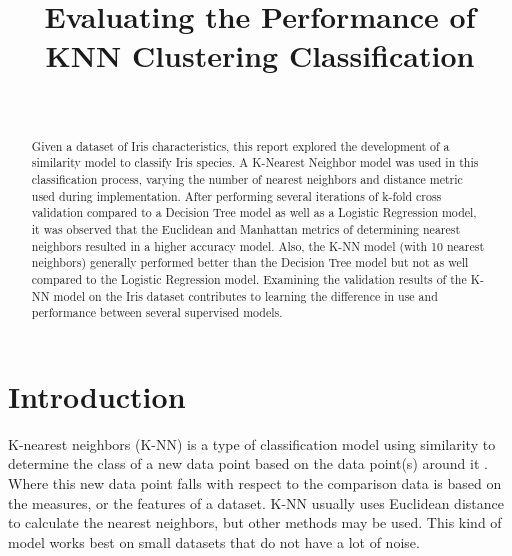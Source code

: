 \documentclass[journal]{IEEEtran}
\begin{document}
\setlength{\emergencystretch}{12pt}
\setlength{\parindent}{10pt}



\lstset{style=mystyle}

\title{Evaluating the Performance of KNN Clustering Classification}

\author{
\\
}

\maketitle

\begin{abstract}
\label{log:abstract}
Given a dataset of Iris characteristics, this report explored the development of a similarity model to classify Iris species. A K-Nearest Neighbor model was used in this classification process, varying the number of nearest neighbors and distance metric used during implementation. After performing several iterations of k-fold cross validation compared to a Decision Tree model as well as a Logistic Regression model, it was observed that the Euclidean and Manhattan metrics of determining nearest neighbors resulted in a higher accuracy model. Also, the K-NN model (with 10 nearest neighbors) generally performed better than the Decision Tree model but not as well compared to the Logistic Regression model. Examining the validation results of the K-NN model on the Iris dataset contributes to learning the difference in use and performance between several supervised models.

\end{abstract}

\section{Introduction}
K-nearest neighbors (K-NN) is a type of classification model using similarity to determine the class of a new data point based on the data point(s) around it \cite{b1}. Where this new data point falls with respect to the comparison data is based on the measures, or the features of a dataset. K-NN usually uses Euclidean distance to calculate the nearest neighbors, but other methods may be used. This kind of model works best on small datasets that do not have a lot of noise. 
\end{document}
